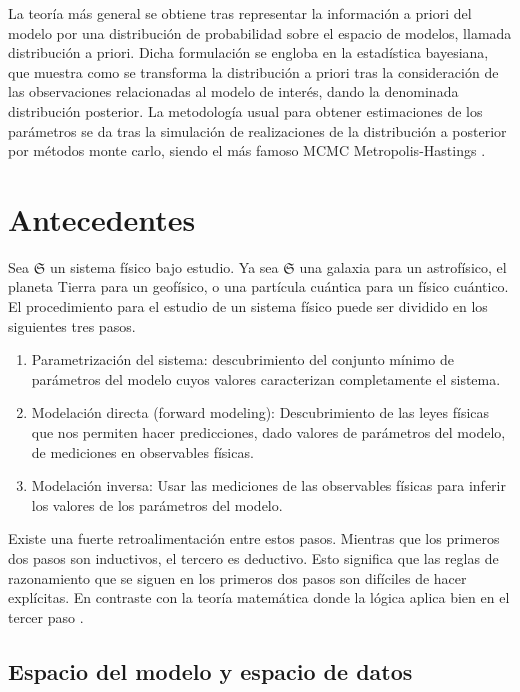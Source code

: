\documentclass{article}
\begin{document}
La teoría más general se obtiene tras representar la información a priori del modelo por una distribución de probabilidad sobre el espacio de modelos, llamada distribución a priori. Dicha formulación se engloba en la estadística bayesiana, que muestra como se transforma la distribución a priori tras la consideración de las observaciones relacionadas al modelo de interés, dando la denominada distribución posterior. La metodología usual para obtener estimaciones de los parámetros se da tras la simulación de realizaciones de la distribución a posterior por métodos monte carlo, siendo el más famoso MCMC Metropolis-Hastings \cite{robert1999monte}. 


\section{Antecedentes}


Sea $\mathfrak{S}$ un sistema físico bajo estudio. Ya sea $\mathfrak{S}$ una galaxia para un astrofísico, el planeta Tierra para un geofísico, o una partícula cuántica para un físico cuántico. 
El procedimiento para el estudio de un sistema físico puede ser dividido en los siguientes tres pasos. 
\begin{enumerate}
    \item Parametrización del sistema: descubrimiento del conjunto mínimo de parámetros del modelo cuyos valores caracterizan completamente el sistema.
    \item Modelación directa (forward modeling): Descubrimiento de las leyes físicas que nos permiten hacer predicciones, dado valores de parámetros del modelo, de mediciones en observables físicas.
    \item Modelación inversa: Usar las mediciones de las observables físicas para inferir los valores de los parámetros del modelo.
\end{enumerate}
Existe una fuerte retroalimentación entre estos pasos. Mientras que los primeros dos pasos son inductivos, el tercero es deductivo. Esto significa que las reglas de razonamiento que se siguen en los primeros dos pasos son difíciles de hacer explícitas. En contraste con la teoría matemática donde la lógica aplica bien en el tercer paso \cite{tarantola2005inverse}. 

\subsection{Espacio del modelo y espacio de datos} 
\end{document}
